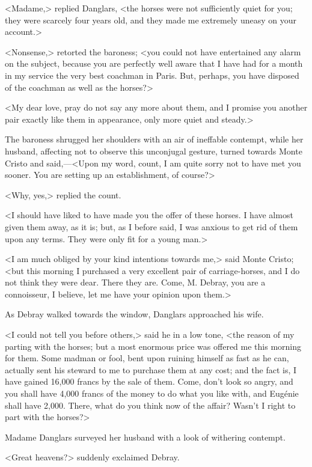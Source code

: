  <Madame,> replied Danglars, <the horses were not sufficiently quiet for you; they were scarcely four years old, and they made me extremely uneasy on your account.> 

 <Nonsense,> retorted the baroness; <you could not have entertained any alarm on the subject, because you are perfectly well aware that I have had for a month in my service the very best coachman in Paris. But, perhaps, you have disposed of the coachman as well as the horses?> 

 <My dear love, pray do not say any more about them, and I promise you another pair exactly like them in appearance, only more quiet and steady.> 

 The baroness shrugged her shoulders with an air of ineffable contempt, while her husband, affecting not to observe this unconjugal gesture, turned towards Monte Cristo and said,—<Upon my word, count, I am quite sorry not to have met you sooner. You are setting up an establishment, of course?> 

 <Why, yes,> replied the count. 

 <I should have liked to have made you the offer of these horses. I have almost given them away, as it is; but, as I before said, I was anxious to get rid of them upon any terms. They were only fit for a young man.> 

 <I am much obliged by your kind intentions towards me,> said Monte Cristo; <but this morning I purchased a very excellent pair of carriage-horses, and I do not think they were dear. There they are. Come, M. Debray, you are a connoisseur, I believe, let me have your opinion upon them.> 

 As Debray walked towards the window, Danglars approached his wife. 

 <I could not tell you before others,> said he in a low tone, <the reason of my parting with the horses; but a most enormous price was offered me this morning for them. Some madman or fool, bent upon ruining himself as fast as he can, actually sent his steward to me to purchase them at any cost; and the fact is, I have gained 16,000 francs by the sale of them. Come, don't look so angry, and you shall have 4,000 francs of the money to do what you like with, and Eugénie shall have 2,000. There, what do you think now of the affair? Wasn't I right to part with the horses?> 

 Madame Danglars surveyed her husband with a look of withering contempt. 

 <Great heavens?> suddenly exclaimed Debray. 

